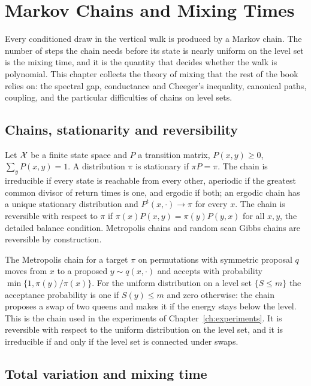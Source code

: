 \chapter{Markov Chains and Mixing Times}
\label{ch:mixing}

Every conditioned draw in the vertical walk is produced by a Markov chain. The number of steps the chain needs before its state is nearly uniform on the level set is the mixing time, and it is the quantity that decides whether the walk is polynomial. This chapter collects the theory of mixing that the rest of the book relies on: the spectral gap, conductance and Cheeger's inequality, canonical paths, coupling, and the particular difficulties of chains on level sets.

\section{Chains, stationarity and reversibility}

Let $\mathcal{X}$ be a finite state space and $P$ a transition matrix, $P(x, y) \ge 0$, $\sum_y P(x, y) = 1$. A distribution $\pi$ is stationary if $\pi P = \pi$. The chain is irreducible if every state is reachable from every other, aperiodic if the greatest common divisor of return times is one, and ergodic if both; an ergodic chain has a unique stationary distribution and $P^t(x, \cdot) \to \pi$ for every $x$. The chain is reversible with respect to $\pi$ if $\pi(x) P(x, y) = \pi(y) P(y, x)$ for all $x, y$, the detailed balance condition. Metropolis chains and random scan Gibbs chains are reversible by construction.

The Metropolis chain for a target $\pi$ on permutations with symmetric proposal $q$ moves from $x$ to a proposed $y \sim q(x, \cdot)$ and accepts with probability $\min\{1, \pi(y) / \pi(x)\}$. For the uniform distribution on a level set $\{ S \le m \}$ the acceptance probability is one if $S(y) \le m$ and zero otherwise: the chain proposes a swap of two queens and makes it if the energy stays below the level. This is the chain used in the experiments of Chapter~\ref{ch:experiments}. It is reversible with respect to the uniform distribution on the level set, and it is irreducible if and only if the level set is connected under swaps.

\section{Total variation and mixing time}

